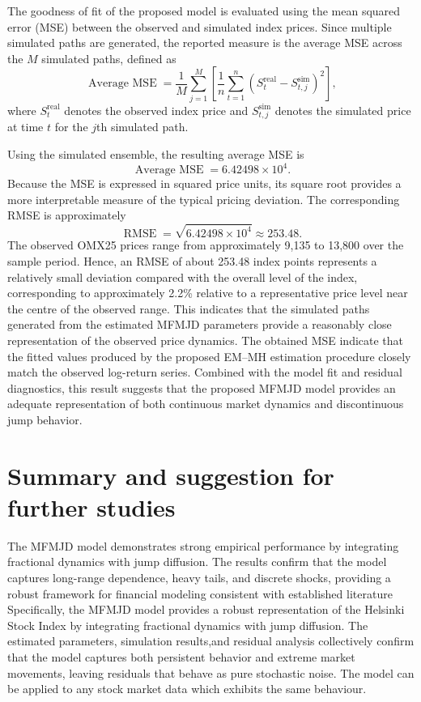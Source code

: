 \documentclass[a4paper,11pt]{amsart}
\theoremstyle{definition}
\theoremstyle{plain}
\theoremstyle{remark}
\newcommand{\1}{\mathbf{1}}
\begin{document}
The goodness of fit of the proposed model is evaluated using the
mean squared error (MSE) between the observed and simulated index
prices. Since multiple simulated paths are generated, the reported
measure is the average MSE across the $M$ simulated paths, defined as
\begin{equation}
\operatorname{Average\ MSE}
=
\frac{1}{M}
\sum_{j=1}^{M}
\left[
\frac{1}{n}
\sum_{t=1}^{n}
\left(
S_t^{\mathrm{real}}-S_{t,j}^{\mathrm{sim}}
\right)^2
\right],
\end{equation}
where $S_t^{\mathrm{real}}$ denotes the observed index price and
$S_{t,j}^{\mathrm{sim}}$ denotes the simulated price at time $t$ for
the $j$th simulated path.

Using the simulated ensemble, the resulting average MSE is
\[
\operatorname{Average\ MSE}
=6.42498\times10^{4}.
\]
Because the MSE is expressed in squared price units, its square root
provides a more interpretable measure of the typical pricing
deviation. The corresponding RMSE is approximately
\[
\operatorname{RMSE}
=\sqrt{6.42498\times10^{4}}
\approx253.48.
\]
The observed OMX25 prices range from approximately
9,135 to 13,800 over the sample period. Hence, an RMSE of about 253.48 index points represents a relatively small deviation compared
with the overall level of the index, corresponding to approximately
2.2\% relative to a representative price level near the centre of the observed range. This indicates that the simulated paths generated
from the estimated MFMJD parameters provide a reasonably close representation of the observed price dynamics.
The obtained MSE indicate that the fitted values produced by the proposed EM--MH estimation procedure closely match the observed log-return series. Combined with the model fit and residual diagnostics, this result suggests that the proposed MFMJD model provides an adequate representation of both continuous market dynamics and discontinuous jump behavior.


\section{Summary and suggestion for further studies }

The MFMJD model demonstrates strong empirical performance by integrating fractional dynamics with jump diffusion. The results confirm that the model captures long-range dependence, heavy tails, and discrete shocks, providing a robust framework for financial modeling consistent with established literature  \cite{Merton1976, mandelbrot1963, Mandelbrot1968}
Specifically, the MFMJD model provides a robust representation of the Helsinki Stock Index by integrating fractional dynamics with jump diffusion. The estimated parameters, simulation results,and residual analysis collectively confirm that the model captures both persistent behavior and extreme market movements, leaving residuals that behave as pure stochastic noise. The model can be applied to any stock market data which exhibits the same behaviour. 
\end{document}
